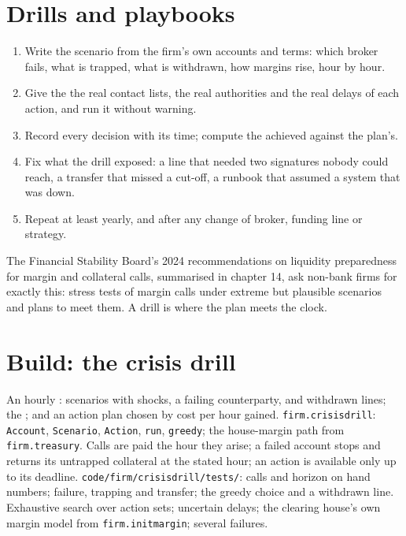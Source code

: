 \section{Drills and playbooks}

\begin{method}\label{met:fm:crisis-management:drill}
\begin{enumerate}
\item Write the scenario from the firm's own accounts and terms: which broker fails, what is trapped, what is withdrawn, how margins rise, hour by
hour.
\item Give the  the real contact lists, the real authorities and the real delays of each action, and run it without warning.
\item Record every decision with its time; compute the  achieved against the plan's.
\item Fix what the drill exposed: a line that needed two signatures nobody could reach, a transfer that missed a cut-off, a runbook that assumed a
system that was down.
\item Repeat at least yearly, and after any change of broker, funding line or strategy.
\end{enumerate}
\end{method}

The Financial Stability Board's 2024 recommendations on liquidity preparedness for margin and collateral calls, summarised in chapter 14, ask
non-bank firms for exactly this: stress tests of margin calls under extreme but plausible scenarios and plans to meet them. A drill is where the
plan meets the clock.

\section{Build: the crisis drill}\label{bld:fm:crisis-management:crisisdrill}

\begin{build}
 An hourly : scenarios with shocks, a failing counterparty,  and withdrawn lines; the ;
and an action plan chosen by cost per hour gained.
 \texttt{firm.crisisdrill}: \texttt{Account}, \texttt{Scenario}, \texttt{Action}, \texttt{run}, \texttt{greedy}; the house-margin path
from \texttt{firm.treasury}.
 Calls are paid the hour they arise; a failed account stops and returns its untrapped collateral at the stated hour; an action is
available only up to its deadline.
 \texttt{code/firm/crisisdrill/tests/}: calls and horizon on hand numbers; failure, trapping and transfer; the greedy choice
and a withdrawn line.
 Exhaustive search over action sets; uncertain delays; the clearing house's own margin model from \texttt{firm.initmargin}; several
failures.
\end{build}

